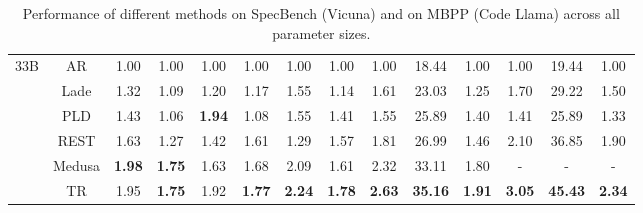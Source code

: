 \begin{table}[ht]
\begin{tabular}{cc|cccccc|ccc|ccc}
 \midrule
\multirow{6}{*}{33B}
~ & AR & 1.00 & 1.00 & 1.00 & 1.00 & 1.00 & 1.00 & 1.00 & 18.44 & 1.00 & 1.00 & 19.44 & 1.00 \\
~ & Lade & 1.32 & 1.09 & 1.20 & 1.17 & 1.55 & 1.14 & 1.61 & 23.03 & 1.25 & 1.70 & 29.22 & 1.50 \\
~ & PLD & 1.43 & 1.06 & \textbf{1.94} & 1.08 & 1.55 & 1.41 & 1.55 & 25.89 & 1.40 & 1.41 & 25.89 & 1.33 \\
~ & REST & 1.63 & 1.27 & 1.42 & 1.61 & 1.29 & 1.57 & 1.81 & 26.99 & 1.46 & 2.10 & 36.85 & 1.90 \\
\rowcolor[RGB]{230, 230, 230} \cellcolor{white} ~ &  Medusa & \textbf{1.98} & \textbf{1.75} & 1.63 & 1.68 & 2.09 & 1.61 & 2.32 & 33.11 & 1.80 & - & - & - \\
~ & TR & 1.95 & \textbf{1.75} & 1.92 & \textbf{1.77} & \textbf{2.24} & \textbf{1.78} & \textbf{2.63} & \textbf{35.16} & \textbf{1.91} & \textbf{3.05} & \textbf{45.43} & \textbf{2.34} \\
 \bottomrule
\end{tabular}
\caption{Performance of different methods on SpecBench (Vicuna) and on MBPP (Code Llama) across all parameter sizes.
}
\label{tab:main_results}
\end{table}
